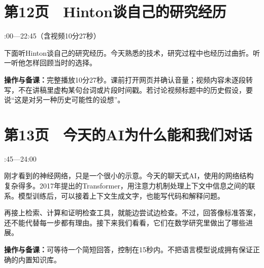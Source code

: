 \documentclass[UTF8,a4paper,11pt,fontset=fandol]{ctexart}
\newcommand{\tip}[1]{\par{\small\color{black!65}\noindent\textbf{操作与备课：}#1\par}}
\begin{document}
\par\noindent\begin{minipage}{\linewidth}

\section*{第12页　Hinton谈自己的研究经历}

{\small{}:00—22:45（含视频10分27秒）\par}

下面听Hinton谈自己的研究经历。今天熟悉的技术，研究过程中也经历过曲折。听一听他怎样回顾当时的选择。

\tip{完整播放10分27秒。课前打开网页并确认音量；视频内容未逐段转写，不在讲稿里虚构某句台词或片段时间戳。若讨论视频标题中的历史假设，要说“这是对另一种历史可能性的设想”。}

\end{minipage}\par\vspace{2mm}

\par\noindent\begin{minipage}{\linewidth}

\section*{第13页　今天的AI为什么能和我们对话}

{\small{}:45—24:00\par}

刚才看到的神经网络，只是一个很小的示意。今天的聊天式AI，使用的网络结构复杂得多。2017年提出的Transformer，用注意力机制处理上下文中信息之间的联系。模型训练后，可以接着上下文生成文字，也能写代码和解释问题。

再接上检索、计算和证明检查工具，就能边尝试边检查。不过，回答像标准答案，还不能代替每一步都有理由。接下来我们看看，它们在数学研究里做出了哪些进展。

\tip{可等待一个简短回答，控制在15秒内。不把语言模型说成拥有保证正确的内置知识库。}

\end{minipage}\par\vspace{2mm}
\end{document}
